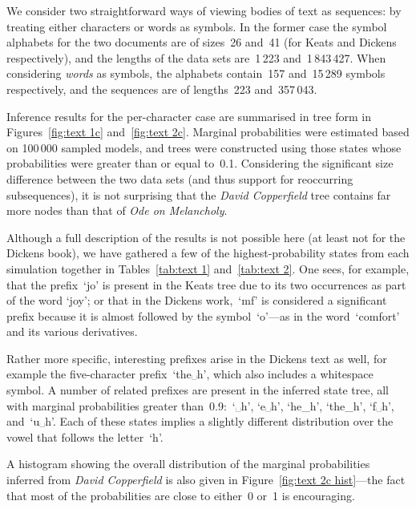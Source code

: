 \documentclass[12pt,a4paper]{article}
\begin{document}
We consider two straightforward ways of viewing bodies of text as sequences: by
treating either characters or words as symbols. In the former case the symbol
alphabets for the two documents are of sizes~26 and~41 (for Keats and Dickens
respectively), and the lengths of the data sets are~1\,223 and~1\,843\,427. When
considering \emph{words} as symbols, the alphabets contain~157 and~15\,289
symbols respectively, and the sequences are of lengths~223 and~357\,043.

Inference results for the per-character case are summarised in tree form in
Figures~\ref{fig:text 1c} and~\ref{fig:text 2c}. Marginal probabilities were
estimated based on 100\,000 sampled models, and trees were constructed using
those states whose probabilities were greater than or equal to~0.1. Considering
the significant size difference between the two data sets (and thus support for
reoccurring subsequences), it is not surprising that the \textit{David
Copperfield} tree contains far more nodes than that of \textit{Ode on
Melancholy}.

Although a full description of the results is not possible here (at least not
for the Dickens book), we have gathered a few of the highest-probability states
from each simulation together in Tables~\ref{tab:text 1} and~\ref{tab:text 2}.
One sees, for example, that the prefix~`jo' is present in the Keats tree due to
its two occurrences as part of the word `joy'; or that in the Dickens work,~`mf'
is considered a significant prefix because it is almost followed by the
symbol~`o'---as in the word~`comfort' and its various derivatives.

Rather more specific, interesting prefixes arise in the Dickens text as well,
for example the five-character prefix~`the␣h', which also includes a whitespace
symbol. A number of related prefixes are present in the inferred state tree, all
with marginal probabilities greater than~0.9:~`␣h', `e␣h', `he_h', `the_h',
`f␣h', and~`u␣h'. Each of these states implies a slightly different distribution
over the vowel that follows the letter~`h'.

A histogram showing the overall distribution of the marginal probabilities
inferred from \textit{David Copperfield} is also given in Figure~\ref{fig:text
2c hist}---the fact that most of the probabilities are close to either~0 or~1 is
encouraging.
\end{document}
